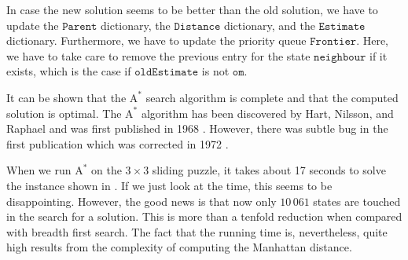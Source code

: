 \begin{enumerate}
\begin{enumerate}
            In case the new solution seems to be better than the old solution, we have to update
            the $\mathtt{Parent}$ dictionary, the $\mathtt{Distance}$ dictionary, and the $\mathtt{Estimate}$
            dictionary.  Furthermore, we have to update the priority queue $\mathtt{Frontier}$.
            Here, we have to take care to remove the previous entry for the state
            $\mathtt{neighbour}$ if it exists, which is the case if $\mathtt{oldEstimate}$ is not $\mathtt{om}$.
      \end{enumerate}
\end{enumerate}
It can be shown that the $\mathrm{A}^*$ search algorithm is complete and that the computed solution is optimal.
The $\mathrm{A}^*$ algorithm has been discovered by Hart, Nilsson, and Raphael and was first published in
1968 \cite{hart:1968}.  However, there was subtle bug in the first publication which was corrected
in 1972 \cite{hart:1972}.

When we run $\mathrm{A}^*$ on the $3 \times 3$ sliding puzzle, it takes about 17 seconds to solve the instance
shown in .  If we just look at the time, this seems to be disappointing.  However, the good
news is that now only $10\,061$ states are touched in the search for a solution.  This is more than a tenfold
reduction when compared with breadth first search.  The fact that the running time
is, nevertheless, quite high results from the complexity of computing the Manhattan distance.




